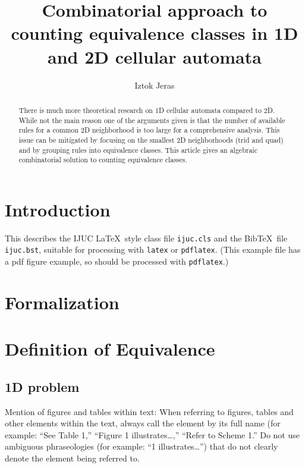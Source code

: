 \documentclass{ijuc}
\begin{document}
\title{Combinatorial approach to counting equivalence classes in 1D and 2D cellular automata}
\author{Iztok Jeras}
\def\received{Received 17 December 2004; In final form 1 April 2005}

\maketitle

\begin{abstract}
There is much more theoretical research on 1D cellular automata compared to 2D.
While not the main reason one of the arguments given is that the number of
available rules for a common 2D neighborhood is too large for a comprehensive
analysis. This issue can be mitigated by focusing on the smallest 2D neighborhoods
(trid and quad) and by grouping rules into equivalence classes. This article
gives an algebraic combinatorial solution to counting equivalence classes.
\end{abstract}


\section{Introduction}

This describes the IJUC \LaTeX\ style
class file {\tt ijuc.cls} and the Bib\TeX\ file {\tt ijuc.bst},
suitable for processing with {\tt latex} or {\tt pdflatex}.
(This example file has a pdf figure example,
so should be processed with {\tt pdflatex}.)

\section{Formalization}

\section{Definition of Equivalence}

\subsection{1D problem}

Mention of figures and tables within text: When referring to figures, tables
and other elements within the text, always call the element by its full name (for
example: ``See Table 1,'' ``Figure 1 illustrates\ldots,'' ``Refer to Scheme 1.'' Do not
use ambiguous phraseologies (for example: ``1 illustrates\ldots'') that do not clearly
denote the element being referred to.
\end{document}
